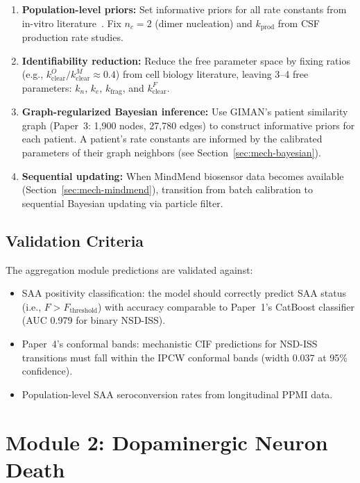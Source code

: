 \begin{enumerate}
\item \textbf{Population-level priors:} Set informative priors for all rate constants from in-vitro literature~\cite{knowles2009,dear2020}. Fix $n_c = 2$ (dimer nucleation) and $k_\text{prod}$ from CSF production rate studies.

\item \textbf{Identifiability reduction:} Reduce the free parameter space by fixing ratios (e.g., $k_\text{clear}^O / k_\text{clear}^M \approx 0.4$) from cell biology literature, leaving 3--4 free parameters: $k_n$, $k_e$, $k_\text{frag}$, and $k_\text{clear}^F$.

\item \textbf{Graph-regularized Bayesian inference:} Use GIMAN's patient similarity graph (Paper~3: 1,900 nodes, 27,780 edges) to construct informative priors for each patient. A patient's rate constants are informed by the calibrated parameters of their graph neighbors (see Section~\ref{sec:mech-bayesian}).

\item \textbf{Sequential updating:} When MindMend biosensor data becomes available (Section~\ref{sec:mech-mindmend}), transition from batch calibration to sequential Bayesian updating via particle filter.
\end{enumerate}

\subsection{Validation Criteria}

The aggregation module predictions are validated against:
\begin{itemize}
\item SAA positivity classification: the model should correctly predict SAA status (i.e., $F > F_\text{threshold}$) with accuracy comparable to Paper~1's CatBoost classifier (AUC 0.979 for binary NSD-ISS).
\item Paper~4's conformal bands: mechanistic CIF predictions for NSD-ISS transitions must fall within the IPCW conformal bands (width 0.037 at 95\% confidence).
\item Population-level SAA seroconversion rates from longitudinal PPMI data.
\end{itemize}


\section{Module 2: Dopaminergic Neuron Death}
\label{sec:mech-neuron-death}

